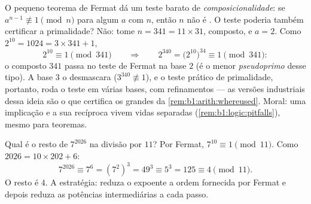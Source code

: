 \begin{example}\label{ex:b1:arith:pseudoprime}
O pequeno teorema de Fermat dá um teste barato de
\emph{composicionalidade}: se $a^{n-1} \not\equiv 1 \pmod n$ para algum $a$  com $n$,
então $n$ não é . O teste poderia também certificar a primalidade?
Não: tome $n = 341 = 11 \times 31$, composto, e $a = 2$. Como
$2^{10} = 1024 = 3 \times 341 + 1$,
\[
2^{10} \equiv 1 \pmod{341}
\qquad\Longrightarrow\qquad
2^{340} = \bigl(2^{10}\bigr)^{34} \equiv 1 \pmod{341} :
\]
o composto $341$ passa no teste de Fermat na base $2$ (é o menor
\emph{pseudoprimo} desse tipo). A base $3$ o desmascara
($3^{340} \not\equiv 1$), e o teste prático de primalidade,
portanto, roda o teste em várias bases, com refinamentos ---
as versões industriais dessa ideia são o que certifica os grandes
 da \cref{rem:b1:arith:whereused}. Moral: uma implicação
e a sua recíproca vivem vidas separadas
(\cref{rem:b1:logic:pitfalls}), mesmo para teoremas.
\end{example}

\begin{example}\label{ex:b1:arith:congruences}
Qual é o resto de $7^{2026}$ na divisão por $11$? Por Fermat, $7^{10}
\equiv 1 \pmod{11}$. Como $2026 = 10 \times 202 + 6$:
\[
7^{2026} \equiv 7^6 = (7^2)^3 = 49^3 \equiv 5^3 = 125 \equiv 4
\pmod{11}.
\]
O resto é $4$. A estratégia: reduza o expoente  a
ordem fornecida por Fermat e depois reduza as potências intermediárias a
cada passo.
\end{example}


